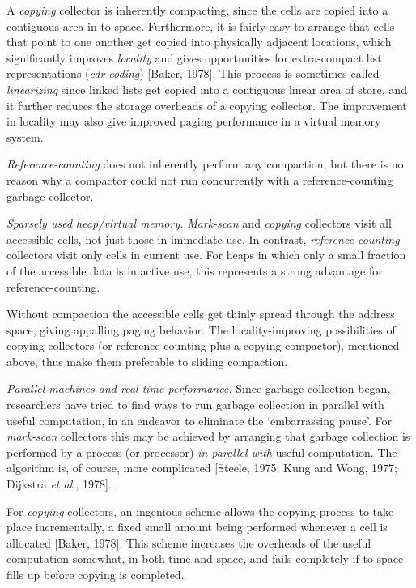 \begin{numbered}
    A \textit{copying} collector is inherently compacting, since the cells are copied
    into a contiguous area in to-space. Furthermore, it is fairly easy to
    arrange that cells that point to one another get copied into physically
    adjacent locations, which significantly improves \textit{locality} and gives
    opportunities for extra-compact list representations (\textit{cdr-coding})
    [Baker, 1978]. This process is sometimes called \textit{linearizing} since linked
    lists get copied into a contiguous linear area of store, and it further
    reduces the storage overheads of a copying collector. The improvement
    in locality may also give improved paging performance in a virtual
    memory system.

    \textit{Reference-counting} does not inherently perform any compaction, but
    there is no reason why a compactor could not run concurrently with a
    reference-counting garbage collector.

    \item \textit{Sparsely used heap/virtual memory.} \textit{Mark-scan} and \textit{copying} collectors
    visit all accessible cells, not just those in immediate use. In contrast,
    \textit{reference-counting} collectors visit only cells in current use. For heaps in
    which only a small fraction of the accessible data is in active use, this
    represents a strong advantage for reference-counting.

    Without compaction the accessible cells get thinly spread through the
    address space, giving appalling paging behavior. The locality-improving
    possibilities of copying collectors (or reference-counting plus a copying
    compactor), mentioned above, thus make them preferable to sliding
    compaction.

    \item \textit{Parallel machines and real-time performance.} Since garbage collection
    began, researchers have tried to find ways to run garbage collection in
    parallel with useful computation, in an endeavor to eliminate the
    `embarrassing pause'. For \textit{mark-scan} collectors this may be achieved by
    arranging that garbage collection is performed by a process (or
    processor) \textit{in parallel with} useful computation. The algorithm is, of
    course, more complicated [Steele, 1975; Kung and Wong, 1977; Dijkstra
    \textit{et al.}, 1978].

    For \textit{copying} collectors, an ingenious scheme allows the copying
    process to take place incrementally, a fixed small amount being
    performed whenever a cell is allocated [Baker, 1978]. This scheme
    increases the overheads of the useful computation somewhat, in both
    time and space, and fails completely if to-space fills up before copying is
    completed.


\end{numbered}
